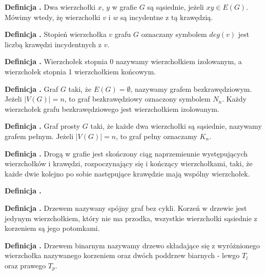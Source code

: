 \noindent
\textbf{Definicja \graphDefinitionIndex.}
\incrementGraphDefinitionIndex
Dwa wierzchołki $x$, $y$ w grafie $G$ są sąsiednie, jeżeli $xy \in E(G)$.
Mówimy wtedy, żę wierzchołki $v$ i $w$ są incydentne z tą krawędzią.

\noindent
\textbf{Definicja \graphDefinitionIndex.}
\incrementGraphDefinitionIndex
Stopień wierzchołka $v$ grafu $G$ oznaczany symbolem $deg(v)$ jest liczbą krawędzi incydentnych z $v$.

\noindent
\textbf{Definicja \graphDefinitionIndex.}
\incrementGraphDefinitionIndex
Wierzchołek stopnia 0 nazywamy wierzchołkiem izolowanym, a wierzchołek stopnia 1 wierzchołkiem końcowym.

\noindent
\textbf{Definicja \graphDefinitionIndex.}
\incrementGraphDefinitionIndex
Graf $G$ taki, że $E(G) = \emptyset$, nazywamy grafem bezkrawędziowym. Jeżeli $|V(G)| = n$, to graf bezkrawędziowy oznaczony symbolem $N_n$.
Każdy wierzchołek grafu bezkrawędziowego jest wierzchołkiem izolowanym.

\noindent
\textbf{Definicja \graphDefinitionIndex.}
\incrementGraphDefinitionIndex
Graf prosty $G$ taki, że każde dwa wierzchołki są sąsiednie, nazywamy grafem pełnym.
Jeżeli $|V(G)| = n$, to graf pełny oznaczamy $K_n$.

\noindent
\textbf{Definicja \graphDefinitionIndex.}
\incrementGraphDefinitionIndex
Drogą w grafie jest skończony ciąg naprzemiennie występujących wierzchołków i krawędzi, rozpoczynający się
i kończący wierzchołkami, taki, że każde dwie kolejno po sobie następujące krawędzie mają wspólny wierzchołek.

\noindent
\textbf{Definicja \graphDefinitionIndex.}
\incrementGraphDefinitionIndex

\noindent
\textbf{Definicja \graphDefinitionIndex.}
\incrementGraphDefinitionIndex
Drzewem nazywany spójny graf bez cykli. Korzeń w drzewie jest jedynym wierzchołkiem,
który nie ma przodka, wszystkie wierzchołki sąsiednie z korzeniem są jego potomkami.

\noindent
\textbf{Definicja \graphDefinitionIndex.}
\incrementGraphDefinitionIndex
Drzewem binarnym nazywamy drzewo składające się z wyróżnionego wierzchołka nazywanego korzeniem oraz dwóch poddrzew biarnych
- lewgo $T_l$ oraz prawego $T_p$.
